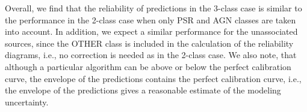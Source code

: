 \documentclass{aa}
\begin{document}
\begin{appendix}
Overall, we find that the reliability of predictions in the 3-class case is similar to the performance
in the 2-class case when only PSR and AGN classes are taken into account.
In addition, we expect a similar performance for the unassociated sources, since the OTHER class is included in the 
calculation of the reliability diagrams, i.e., no correction is needed as in the 2-class case.
We also note, that although a particular algorithm can be above or below the perfect calibration curve, 
the envelope of the predictions contains the perfect calibration curve, i.e., the envelope of the predictions gives a reasonable
estimate of the modeling uncertainty.



\end{appendix}
\end{document}
